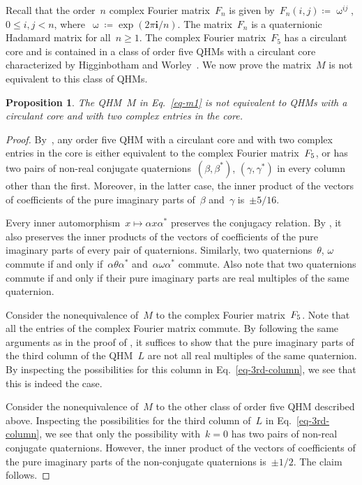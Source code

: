 \documentclass[12pt]{article}
\numberwithin{equation}{section}
\newtheorem{proposition}[theorem]{Proposition}
\newcommand{\qi}{\mathbf{i}}
\newcommand{\eqdef}{\coloneqq}
\begin{document}
Recall that the order~$n$ complex Fourier matrix~$F_n$ is given by~$F_n(i,j) \eqdef \upomega^{ij}$, $0 \le i,j < n$, where~$\upomega \eqdef \exp(2\pi \qi/n)$. The matrix~$F_n$ is a quaternionic Hadamard matrix for all~$n \ge 1$. The complex Fourier matrix~$F_5$ has a circulant core and is contained in a class of order five QHMs with a circulant core characterized by Higginbotham and Worley~\cite[Theorem~6]{HW22-qhm}. We now prove the matrix~$M$ is not equivalent to this class of QHMs.
\begin{proposition}
\label{prop-noneq-circulant}
The QHM\/~$M$ in Eq.~\eqref{eq-m1} is not equivalent to QHMs with a circulant core and with two complex entries in the core.
\end{proposition}
\begin{proof}
By~\cite[Theorem~6]{HW22-qhm}, any order five QHM with a circulant core and with two complex entries in the core is either equivalent to the complex Fourier matrix~$F_5 \mspace{0.7mu}$, or has two pairs of non-real conjugate quaternions~$(\beta, \beta^*)$, $(\gamma, \gamma^*)$ in every column other than the first. Moreover, in the latter case, the inner product of the vectors of coefficients of the pure imaginary parts of~$\beta$ and~$\gamma$ is~$\pm 5/16$.

Every inner automorphism~$x \mapsto \alpha x \alpha^*$ preserves the conjugacy relation. By , it also preserves the inner products of the vectors of coefficients of the pure imaginary parts of every pair of quaternions. Similarly, two quaternions~$\theta$, $\omega$ commute if and only if~$\alpha \theta \alpha^*$ and~$\alpha \omega \alpha^*$ commute.
Also note that two quaternions commute if and only if their pure imaginary parts are real multiples of the same quaternion.

Consider the nonequivalence of~$M$ to the complex Fourier matrix~$F_5 \mspace{0.7mu}$. Note that all the entries of the complex Fourier matrix commute. By following the same arguments as in the proof of , it suffices to show that the pure imaginary parts of the third column of the QHM~$L$ are not all real multiples of the same quaternion. By inspecting the possibilities for this column in Eq.~\eqref{eq-3rd-column}, we see that this is indeed the case.

Consider the nonequivalence of~$M$ to the other class of order five QHM described above. Inspecting the possibilities for the third column of~$L$ in Eq.~\eqref{eq-3rd-column}, we see that only the possibility with~$k = 0$ has two pairs of non-real conjugate quaternions. However, the inner product of the vectors of coefficients of the pure imaginary parts of the non-conjugate quaternions is~$\pm 1/2$. The claim follows.
\end{proof}
\end{document}
